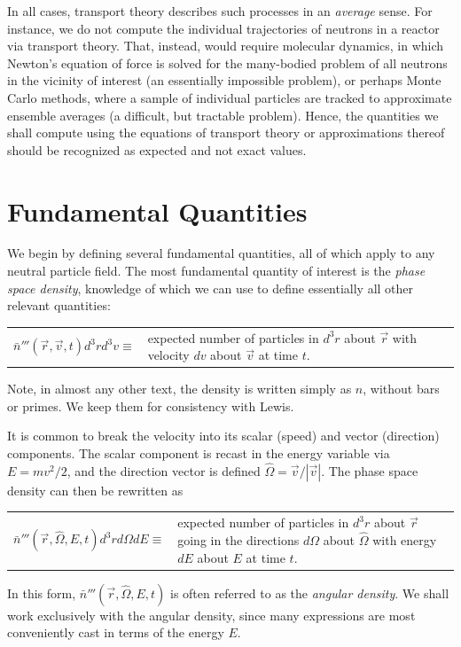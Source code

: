 In all cases, transport theory describes such processes in an \textit{average} 
sense.  For instance, we do not compute the individual trajectories of 
neutrons in a reactor via transport theory.  That, instead, would require 
molecular dynamics, in which Newton's equation of force is solved for the
many-bodied problem of all neutrons in the vicinity of interest (an 
essentially impossible problem), or perhaps Monte Carlo methods, where a 
sample of individual particles are tracked to approximate ensemble averages 
(a difficult, but tractable problem).  Hence, the quantities we shall 
compute using the equations of transport theory or approximations thereof 
should be recognized as expected and not exact values.

\section{Fundamental Quantities}

We begin by defining several fundamental quantities, all of which apply to 
any neutral particle field. The most fundamental quantity of interest is 
the \textit{phase space density}, knowledge of which we can use to define 
essentially all other relevant quantities:
\begin{center}
  \begin{tabular}{cp{7.0cm}}
    $\bar{n}'''(\vec{r},\vec{v},t)d^3r d^3v \equiv $ &
      expected number of particles in  $d^3r$  about  $\vec{r}$  
      with velocity  $dv$ about  $\vec{v}$ at time $t$.  
  \end{tabular}
\end{center}
Note, in almost any other text, the density is written simply as $n$, 
without bars or primes.  We keep them for consistency  with Lewis.

It is common to break the velocity into its scalar (speed) and vector 
(direction) components.  The scalar component is recast in the energy 
variable via $E = mv^2/2$, and the direction vector is defined 
$\hat{\Omega}=\vec{v}/|\vec{v}|$.  The phase space density can then be 
rewritten as
\begin{center}
  \begin{tabular}{cp{7.0cm}}
    $\bar{n}'''(\vec{r},\hat{\Omega},E,t)d^3r d\Omega dE \equiv $ &
      expected number of particles in  $d^3r$  about  $\vec{r}$  going 
      in the directions $d\Omega$ about $\hat{\Omega}$ with energy  
      $dE$ about  $E$ at time $t$.  
  \end{tabular}
\end{center}
In this form, $\bar{n}'''(\vec{r},\hat{\Omega},E,t)$ is often referred to 
as the \textit{angular density}.  We shall work exclusively with the angular 
density, since many expressions are most conveniently cast in terms of the 
energy $E$.

